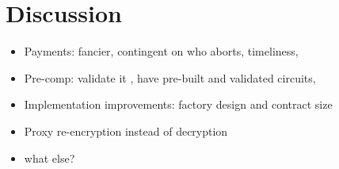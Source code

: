\section{Discussion}

\begin{itemize}
\item Payments: fancier, contingent on who aborts, timeliness, \etc
\item Pre-comp: validate it , have pre-built and validated circuits, \etc
\item Implementation improvements: factory design and contract size
\item Proxy re-encryption instead of decryption
\item what else?
\end{itemize}